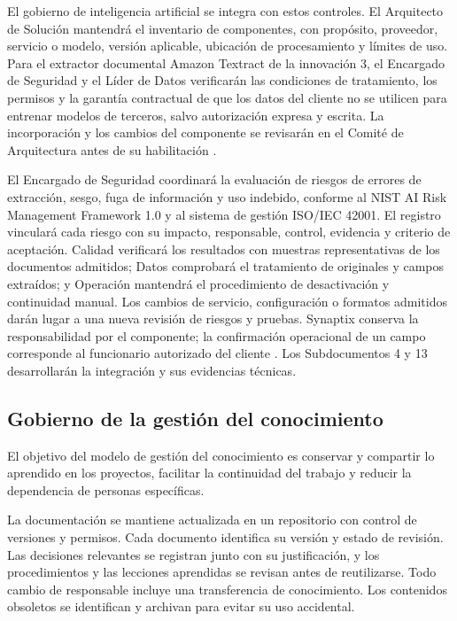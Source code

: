 El gobierno de inteligencia artificial se integra con estos controles. El Arquitecto de Solución mantendrá el inventario de componentes, con propósito, proveedor, servicio o modelo, versión aplicable, ubicación de procesamiento y límites de uso. Para el extractor documental Amazon Textract de la innovación 3, el Encargado de Seguridad y el Líder de Datos verificarán las condiciones de tratamiento, los permisos y la garantía contractual de que los datos del cliente no se utilicen para entrenar modelos de terceros, salvo autorización expresa y escrita. La incorporación y los cambios del componente se revisarán en el Comité de Arquitectura antes de su habilitación \parencites[art.~86, p.~44]{bases-admin}[RT-18.01 y RT-18.02, p.~32]{bases-transversales}.

El Encargado de Seguridad coordinará la evaluación de riesgos de errores de extracción, sesgo, fuga de información y uso indebido, conforme al NIST AI Risk Management Framework 1.0 y al sistema de gestión ISO/IEC 42001. El registro vinculará cada riesgo con su impacto, responsable, control, evidencia y criterio de aceptación. Calidad verificará los resultados con muestras representativas de los documentos admitidos; Datos comprobará el tratamiento de originales y campos extraídos; y Operación mantendrá el procedimiento de desactivación y continuidad manual. Los cambios de servicio, configuración o formatos admitidos darán lugar a una nueva revisión de riesgos y pruebas. Synaptix conserva la responsabilidad por el componente; la confirmación operacional de un campo corresponde al funcionario autorizado del cliente \parencites{nist-ai-rmf}[art.~86, p.~44]{bases-admin}[RT-18.04 a RT-18.09, p.~32]{bases-transversales}. Los Subdocumentos 4 y 13 desarrollarán la integración y sus evidencias técnicas.



\subsection{Gobierno de la gestión del conocimiento}

El objetivo del modelo de gestión del conocimiento es conservar y compartir
lo aprendido en los proyectos, facilitar la continuidad del trabajo
y reducir la dependencia de personas específicas.

La documentación se mantiene actualizada en un repositorio
con control de versiones y permisos. Cada documento identifica su
 versión y estado de revisión. Las decisiones relevantes
se registran junto con su justificación, y los procedimientos y las
lecciones aprendidas se revisan antes de reutilizarse. Todo cambio de
responsable incluye una transferencia de conocimiento. Los contenidos
obsoletos se identifican y archivan para evitar su uso accidental.


